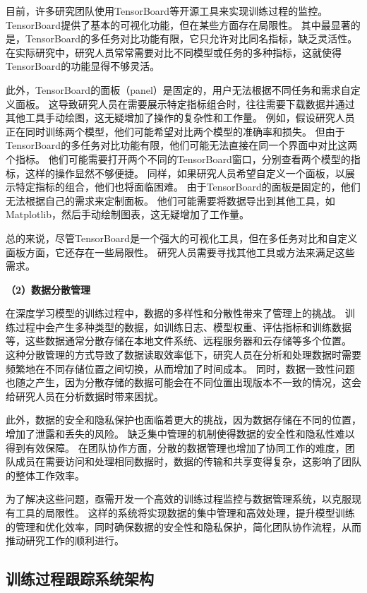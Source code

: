 目前，许多研究团队使用TensorBoard等开源工具来实现训练过程的监控。
TensorBoard提供了基本的可视化功能，但在某些方面存在局限性。
其中最显著的是，TensorBoard的多任务对比功能有限，它只允许对比同名指标，缺乏灵活性。
在实际研究中，研究人员常常需要对比不同模型或任务的多种指标，这就使得TensorBoard的功能显得不够灵活。

此外，TensorBoard的面板（panel）是固定的，用户无法根据不同任务和需求自定义面板。
这导致研究人员在需要展示特定指标组合时，往往需要下载数据并通过其他工具手动绘图，这无疑增加了操作的复杂性和工作量。
例如，假设研究人员正在同时训练两个模型，他们可能希望对比两个模型的准确率和损失。
但由于TensorBoard的多任务对比功能有限，他们可能无法直接在同一个界面中对比这两个指标。
他们可能需要打开两个不同的TensorBoard窗口，分别查看两个模型的指标，这样的操作显然不够便捷。
同样，如果研究人员希望自定义一个面板，以展示特定指标的组合，他们也将面临困难。
由于TensorBoard的面板是固定的，他们无法根据自己的需求来定制面板。
他们可能需要将数据导出到其他工具，如Matplotlib，然后手动绘制图表，这无疑增加了工作量。

总的来说，尽管TensorBoard是一个强大的可视化工具，但在多任务对比和自定义面板方面，它还存在一些局限性。
研究人员需要寻找其他工具或方法来满足这些需求。

\textbf{（2）数据分散管理}

在深度学习模型的训练过程中，数据的多样性和分散性带来了管理上的挑战。
训练过程中会产生多种类型的数据，如训练日志、模型权重、评估指标和训练数据等，这些数据通常分散存储在本地文件系统、远程服务器和云存储等多个位置。
这种分散管理的方式导致了数据读取效率低下，研究人员在分析和处理数据时需要频繁地在不同存储位置之间切换，从而增加了时间成本。
同时，数据一致性问题也随之产生，因为分散存储的数据可能会在不同位置出现版本不一致的情况，这会给研究人员在分析数据时带来困扰。

此外，数据的安全和隐私保护也面临着更大的挑战，因为数据存储在不同的位置，增加了泄露和丢失的风险。
缺乏集中管理的机制使得数据的安全性和隐私性难以得到有效保障。
在团队协作方面，分散的数据管理也增加了协同工作的难度，团队成员在需要访问和处理相同数据时，数据的传输和共享变得复杂，这影响了团队的整体工作效率。

为了解决这些问题，亟需开发一个高效的训练过程监控与数据管理系统，以克服现有工具的局限性。
这样的系统将实现数据的集中管理和高效处理，提升模型训练的管理和优化效率，同时确保数据的安全性和隐私保护，简化团队协作流程，从而推动研究工作的顺利进行。

\subsection{训练过程跟踪系统架构}

